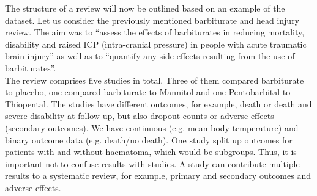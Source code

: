 \vspace{0mm}
The structure of a review will now be outlined based on an example of the dataset. Let us consider the previously mentioned barbiturate and head injury review. The aim was to ``assess the effects of barbiturates in reducing mortality, disability and raised ICP (intra-cranial pressure) in people with acute traumatic brain injury'' as well as to ``quantify any side effects resulting from the use of barbiturates''. \\
The review comprises five studies in total. Three of them compared barbiturate to placebo, one compared barbiturate to Mannitol and one Pentobarbital to Thiopental. The studies have different outcomes, for example, death or death and severe disability at follow up, but also dropout counts or adverse effects (secondary outcomes). 
We have continuous (e.g. mean body temperature) and binary outcome data (e.g. death/no death). One study split up outcomes for patients with and without haematoma, which would be subgroups. Thus, it is important not to confuse results with studies. A study can contribute multiple results to a systematic review, for example, primary and secondary outcomes and adverse effects. 


